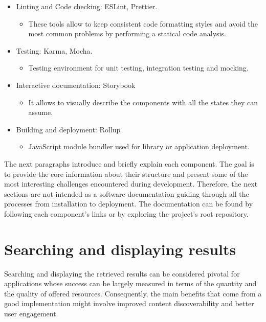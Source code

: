 \begin{itemize}
\item Linting and Code checking: ESLint, Prettier. 
    \begin{itemize}
        \item These tools allow to keep consistent code formatting styles and avoid the most common problems by performing a statical code analysis.
    \end{itemize}
\item Testing: Karma, Mocha.
    \begin{itemize}
        \item Testing environment for unit testing, integration testing and mocking.
    \end{itemize}
\item Interactive documentation: Storybook
    \begin{itemize}
        \item It allows to visually describe the components with all the states they can assume.
    \end{itemize}
\item Building and deployment: Rollup
    \begin{itemize}
        \item JavaScript module bundler used for library or application deployment.
    \end{itemize}
\end{itemize}

The next paragraphs introduce and briefly explain each component. The goal is to provide the core information about their structure and present some of the most interesting challenges encountered during development. Therefore, the next sections are not intended as a software documentation guiding through all the processes from installation to deployment. The documentation can be found by following each component’s links or by exploring the project’s root repository.

\section{Searching and displaying results}
\label{sec:searchingResults}

Searching and displaying the retrieved results can be considered pivotal for applications whose success can be largely measured in terms of the quantity and the quality of offered resources. Consequently, the main benefits that come from a good implementation might involve improved content discoverability and better user engagement.

